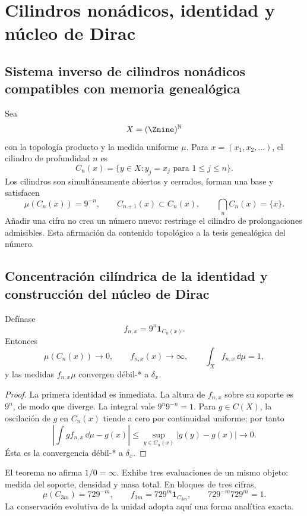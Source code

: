 \chapter{Cilindros nonádicos, identidad y núcleo de Dirac}

\section{Sistema inverso de cilindros nonádicos compatibles con memoria genealógica}

Sea
\[
X=(\Znine)^{\mathbb N}
\]
con la topología producto y la medida uniforme \(\mu\). Para
\(x=(x_1,x_2,\ldots)\), el cilindro de profundidad \(n\) es
\[
C_n(x)=\{y\in X:y_j=x_j\text{ para }1\le j\le n\}.
\]
Los cilindros son simultáneamente abiertos y cerrados, forman una base y
satisfacen
\[
\mu(C_n(x))=9^{-n},\qquad
C_{n+1}(x)\subset C_n(x),\qquad
\bigcap_n C_n(x)=\{x\}.
\]
Añadir una cifra no crea un número nuevo: restringe el cilindro de
prolongaciones admisibles. Esta afirmación da contenido topológico a la tesis
genealógica del número.

\section{Concentración cilíndrica de la identidad y construcción del núcleo de Dirac}

\begin{theorem}
Defínase
\[
f_{n,x}=9^n\mathbf1_{C_n(x)}.
\]
Entonces
\[
\mu(C_n(x))\to0,\qquad f_{n,x}(x)\to\infty,\qquad
\int_Xf_{n,x}\,\dd\mu=1,
\]
y las medidas \(f_{n,x}\mu\) convergen débil-* a \(\delta_x\).
\end{theorem}

\begin{proof}
La primera identidad es inmediata. La altura de \(f_{n,x}\) sobre su soporte
es \(9^n\), de modo que diverge. La integral vale
\(9^n9^{-n}=1\). Para \(g\in C(X)\), la oscilación de \(g\) en \(C_n(x)\)
tiende a cero por continuidad uniforme; por tanto
\[
\left|\int g f_{n,x}\,\dd\mu-g(x)\right|
\le \sup_{y\in C_n(x)}|g(y)-g(x)|\longrightarrow0.
\]
Ésta es la convergencia débil-* a \(\delta_x\).
\end{proof}

El teorema no afirma \(1/0=\infty\). Exhibe tres evaluaciones de un mismo
objeto: medida del soporte, densidad y masa total. En bloques de tres cifras,
\[
\mu(C_{3m})=729^{-m},\qquad
f_{3m}=729^m\mathbf1_{C_{3m}},\qquad
729^{-m}729^m=1.
\]
La conservación evolutiva de la unidad adopta aquí una forma analítica exacta.

